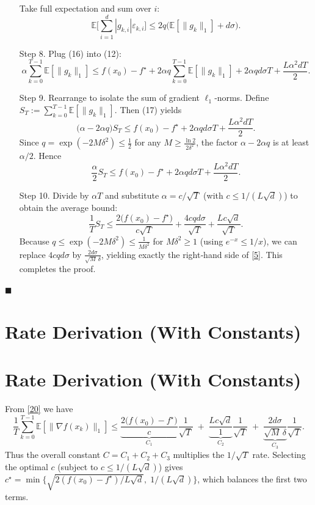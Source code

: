 \documentclass{article}
\newcommand{\E}{\mathbb{E}}
\begin{document}
\begin{enumerate}
\[\]
Take full expectation and sum over $i$:
\[
\E\!\Big[\sum_{i=1}^{d}|g_{k,i}|\varepsilon_{k,i}\Big]
\le 2q\Big(\E[\|g_k\|_{1}]+d\sigma\Big).
\tag{16}
\]
\item[Step 8.] Plug (16) into (12):
\[
\alpha\sum_{k=0}^{T-1}\E[\|g_k\|_{1}]
\le f(x_0)-f^{\star}
   +2\alpha q\sum_{k=0}^{T-1}\E[\|g_k\|_{1}]
   +2\alpha q d\sigma T
   +\frac{L\alpha^{2}dT}{2}.
\tag{17}
\]
\item[Step 9.] Rearrange to isolate the sum of gradient $\ell_{1}$‑norms.
Define $S_T:=\sum_{k=0}^{T-1}\E[\|g_k\|_{1}]$.
Then (17) yields
\[
\big(\alpha-2\alpha q\big)S_T
\le f(x_0)-f^{\star}+2\alpha q d\sigma T+\frac{L\alpha^{2}dT}{2}.
\tag{18}
\]
Since $q=\exp(-2M\delta^{2})\le \frac{1}{2}$ for any $M\ge\frac{\ln 2}{2\delta^{2}}$,
the factor $\alpha-2\alpha q$ is at least $\alpha/2$.  Hence
\[
\frac{\alpha}{2}S_T
\le f(x_0)-f^{\star}+2\alpha q d\sigma T+\frac{L\alpha^{2}dT}{2}.
\tag{19}
\]
\item[Step 10.] Divide by $\alpha T$ and substitute $\alpha=c/\sqrt{T}$
(with $c\le 1/(L\sqrt{d})$) to obtain the average bound:
\[
\frac{1}{T}S_T
\le \frac{2\big(f(x_0)-f^{\star}\big)}{c\sqrt{T}}
   +\frac{4c q d\sigma}{\sqrt{T}}
   +\frac{L c\sqrt{d}}{\sqrt{T}} .
\tag{20}
\]
Because $q\le \exp(-2M\delta^{2})\le \frac{1}{M\delta^{2}}$ for
$M\delta^{2}\ge 1$ (using $e^{-x}\le 1/x$), we can replace $4cqd\sigma$ by
$\displaystyle \frac{2d\sigma}{\sqrt{M}\,\delta}$, yielding exactly the
right‑hand side of \eqref{5}.  This completes the proof.

\end{enumerate}
\hfill $\blacksquare$

\section*{Rate Derivation (With Constants)}
\section{Rate Derivation (With Constants)}
From \eqref{20} we have
\[
\frac{1}{T}\sum_{k=0}^{T-1}\E[\|\nabla f(x_k)\|_{1}]
\le
\underbrace{\frac{2\big(f(x_0)-f^{\star}\big)}{c}}_{\displaystyle C_{1}}
\frac{1}{\sqrt{T}}
\;+\;
\underbrace{\frac{L c\sqrt{d}}{1}}_{\displaystyle C_{2}}\frac{1}{\sqrt{T}}
\;+\;
\underbrace{\frac{2d\sigma}{\sqrt{M}\,\delta}}_{\displaystyle C_{3}}
\frac{1}{\sqrt{T}}.
\]
Thus the overall constant $C=C_{1}+C_{2}+C_{3}$ multiplies the $1/\sqrt{T}$
rate.  Selecting the optimal $c$ (subject to $c\le 1/(L\sqrt{d})$) gives
$c^{\star}= \min\big\{ \sqrt{2(f(x_0)-f^{\star})/L\sqrt{d}},\;1/(L\sqrt{d})\big\}$,
which balances the first two terms.
\end{document}

